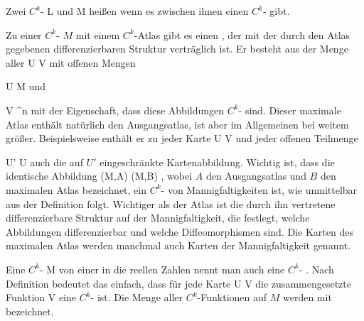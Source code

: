 {}
{

Zwei
$C^k$-
\mathkor {} {L} {und} {M} {}
heißen
wenn es zwischen ihnen einen
$C^k$-
gibt.

}

{}
{

Zu einer
$C^k$-
$M$ mit einem $C^k$-Atlas
 gibt es einen  {,} der mit der durch den Atlas gegebenen differenzierbaren Struktur verträglich ist. Er besteht aus der Menge aller
\maabbdisp {\beta} { U } { V
} {}
mit offenen Mengen

\mavergleichskette
{\vergleichskette
{ U
}
{ \subseteq }{ M
}
{  }{
}
{    }{
}
{   }{
}
}
{}{}{}
und

\mavergleichskette
{\vergleichskette
{ V
}
{ \subseteq }{ \R^n
}
{  }{
}
{    }{
}
{   }{
}
}
{}{}{}
mit der Eigenschaft, dass diese Abbildungen
$C^k$-
 {} {}
sind. Dieser maximale Atlas enthält natürlich den Ausgangsatlas, ist aber im Allgemeinen bei weitem größer. Beispielsweise enthält er zu jeder Karte
\maabb {\beta} { U } { V
} {}
und jeder offenen Teilmenge

\mavergleichskette
{\vergleichskette
{ U'
}
{ \subseteq }{ U
}
{  }{
}
{    }{
}
{   }{
}
}
{}{}{}
auch die auf $U'$ eingeschränkte Kartenabbildung. Wichtig ist, dass die identische Abbildung
 {(M,A)} {(M,B)
} {,}
wobei $A$ den Ausgangsatlas und $B$ den maximalen Atlas bezeichnet, ein
$C^k$-
von Mannigfaltigkeiten ist, wie unmittelbar aus der Definition folgt. Wichtiger als der Atlas ist die durch ihn vertretene differenzierbare Struktur auf der Mannigfaltigkeit, die festlegt, welche Abbildungen differenzierbar und welche Diffeomorphismen sind. Die Karten des maximalen Atlas werden manchmal auch
 {} {}
Karten der Mannigfaltigkeit genannt.

}


Eine
$C^k$-
 {M} {\R
} {}
von einer
in die reellen Zahlen nennt man auch eine $C^k$- {.} Nach Definition bedeutet das einfach, dass für jede Karte
\maabbdisp {\alpha} {U} {V
} {}
die zusammengesetzte Funktion
 {V} {\R
} {}
eine
$C^k$-
ist. Die Menge aller $C^k$-Funktionen auf $M$ werden mit
 bezeichnet.

